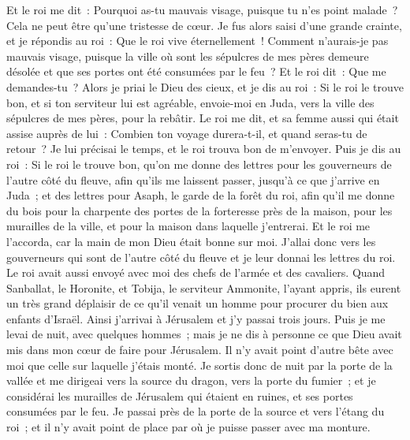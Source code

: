 \begin{multicols}{2}
Et le roi me dit~: Pourquoi as-tu mauvais visage, puisque tu n'es point malade~? Cela ne peut être qu'une tristesse de cœur. Je fus alors saisi d'une grande crainte,
et je répondis au roi~: Que le roi vive éternellement~! Comment n'aurais-je pas mauvais visage, puisque la ville où sont les sépulcres de mes pères demeure désolée et que ses portes ont été consumées par le feu~?
Et le roi dit~: Que me demandes-tu~? Alors je priai le Dieu des cieux,
et je dis au roi~: Si le roi le trouve bon, et si ton serviteur lui est agréable, envoie-moi en Juda, vers la ville des sépulcres de mes pères, pour la rebâtir.
Le roi me dit, et sa femme aussi qui était assise auprès de lui~: Combien ton voyage durera-t-il, et quand seras-tu de retour~? Je lui précisai le temps, et le roi trouva bon de m'envoyer.
Puis je dis au roi~: Si le roi le trouve bon, qu'on me donne des lettres pour les gouverneurs de l'autre côté du fleuve, afin qu'ils me laissent passer, jusqu'à ce que j'arrive en Juda~;
et des lettres pour Asaph, le garde de la forêt du roi, afin qu'il me donne du bois pour la charpente des portes de la forteresse près de la maison, pour les murailles de la ville, et pour la maison dans laquelle j'entrerai. Et le roi me l'accorda, car la main de mon Dieu était bonne sur moi.
J'allai donc vers les gouverneurs qui sont de l'autre côté du fleuve et je leur donnai les lettres du roi. Le roi avait aussi envoyé avec moi des chefs de l'armée et des cavaliers.
Quand Sanballat, le Horonite, et Tobija, le serviteur Ammonite, l'ayant appris, ils eurent un très grand déplaisir de ce qu'il venait un homme pour procurer du bien aux enfants d'Israël.
Ainsi j'arrivai à Jérusalem et j'y passai trois jours.
Puis je me levai de nuit, avec quelques hommes~; mais je ne dis à personne ce que Dieu avait mis dans mon cœur de faire pour Jérusalem. Il n'y avait point d'autre bête avec moi que celle sur laquelle j'étais monté.
Je sortis donc de nuit par la porte de la vallée et me dirigeai vers la source du dragon, vers la porte du fumier~; et je considérai les murailles de Jérusalem qui étaient en ruines, et ses portes consumées par le feu.
Je passai près de la porte de la source et vers l'étang du roi~; et il n'y avait point de place par où je puisse passer avec ma monture.

\end{multicols}
